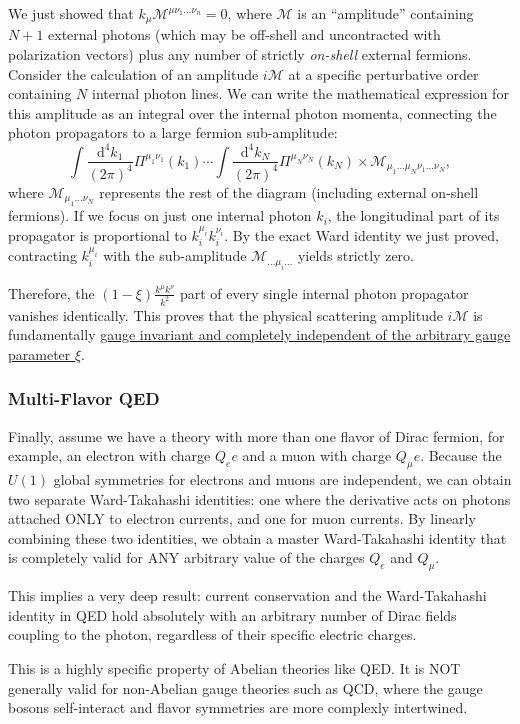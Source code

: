 We just showed that $k_\mu \mathcal{M}^{\mu \nu_1 \dots \nu_n} = 0$, where $\mathcal{M}$ is an ``amplitude'' containing $N+1$ external photons (which may be off-shell and uncontracted with polarization vectors) plus any number of strictly \textit{on-shell} external fermions.
Consider the calculation of an amplitude $i\mathcal{M}$ at a specific perturbative order containing $N$ internal photon lines. We can write the mathematical expression for this amplitude as an integral over the internal photon momenta, connecting the photon propagators to a large fermion sub-amplitude:
\[
    \int \frac{\mathrm{d}^4k_1}{(2\pi)^4} \Pi^{\mu_1 \nu_1}(k_1) \cdots \int \frac{\mathrm{d}^4k_N}{(2\pi)^4} \Pi^{\mu_N \nu_N}(k_N) \times \mathcal{M}_{\mu_1 \dots \mu_N \nu_1 \dots \nu_N},
\]
where $\mathcal{M}_{\mu_1 \dots \nu_N}$ represents the rest of the diagram (including external on-shell fermions).
If we focus on just one internal photon $k_i$, the longitudinal part of its propagator is proportional to $k_i^{\mu_i} k_i^{\nu_i}$. By the exact Ward identity we just proved, contracting $k_i^{\mu_i}$ with the sub-amplitude $\mathcal{M}_{\dots \mu_i \dots}$ yields strictly zero.

Therefore, the $(1-\xi) \frac{k^\mu k^\nu}{k^2}$ part of every single internal photon propagator vanishes identically. This proves that the physical scattering amplitude $i\mathcal{M}$ is fundamentally \uline{gauge invariant and completely independent of the arbitrary gauge parameter $\xi$}.

\subsubsection{Multi-Flavor QED}

Finally, assume we have a theory with more than one flavor of Dirac fermion, for example, an electron with charge $Q_e e$ and a muon with charge $Q_\mu e$.
Because the $U(1)$ global symmetries for electrons and muons are independent, we can obtain two separate Ward-Takahashi identities: one where the derivative acts on photons attached ONLY to electron currents, and one for muon currents. By linearly combining these two identities, we obtain a master Ward-Takahashi identity that is completely valid for ANY arbitrary value of the charges $Q_e$ and $Q_\mu$.

This implies a very deep result: current conservation and the Ward-Takahashi identity in QED hold absolutely with an arbitrary number of Dirac fields coupling to the photon, regardless of their specific electric charges.

\begin{remark}
    This is a highly specific property of Abelian theories like QED. It is NOT generally valid for non-Abelian gauge theories such as QCD, where the gauge bosons self-interact and flavor symmetries are more complexly intertwined.
\end{remark}